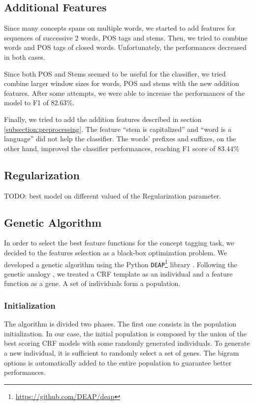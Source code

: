 \subsection{Additional Features}
\label{subsection:additional}
Since many concepts spans on multiple words, we started to add features for sequences of successive 2 words, \ac{POS} tags and stems.
Then, we tried to combine words and \ac{POS} tags of closed words.
Unfortunately, the performances decreased in both cases.

Since both POS and Stems seemed to be useful for the classifier, we tried combine larger window sizes for words, \ac{POS} and stems with the new addition features.
After some attempts, we were able to increase the performances of the model to F1 of $82.63\%$.

Finally, we tried to add the addition features described in section \cref{subsection:preprocessing}.
The feature ``stem is capitalized'' and ``word is a language'' did not help the classifier.
The words' prefixes and suffixes, on the other hand, improved the classifier performances, reaching F1 score of $83.44\%$

\subsection{Regularization}
TODO: best model on different valued of the Regularization parameter.

\subsection{Genetic Algorithm}
\label{subsection:genetic}
In order to select the best feature functions for the concept tagging task, we decided to the features selection as a black-box optimization problem.
We developed a genetic algorithm using the Python \texttt{DEAP}\footnote{\url{https://github.com/DEAP/deap}} library \cite{deap}.
Following the genetic analogy \cite{lion}, we treated a \ac{CRF} template as an individual and a feature function as a gene.
A set of individuals form a population.

\subsubsection{Initialization}
The algorithm is divided two phases.
The first one consists in the population initialization.
In our case, the initial population is composed by the union of the best scoring \ac{CRF} models with some randomly generated individuals.
To generate a new individual, it is sufficient to randomly select a set of genes.
The bigram options is automatically added to the entire population to guarantee better performances.

